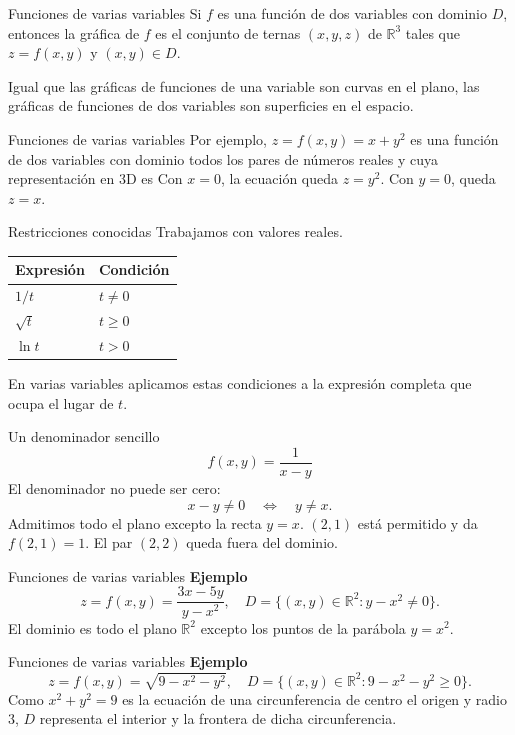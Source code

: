 \begin{frame}{Funciones de varias variables}
\small Si $f$ es una función de dos variables con dominio $D$, entonces la gráfica de $f$ es el conjunto de ternas $(x,y,z)$ de $\mathbb{R}^3$ tales que $z=f(x,y)$ y $(x,y)\in D$.
\medskip

Igual que las gráficas de funciones de una variable son curvas en el plano, las gráficas de funciones de dos variables son superficies en el espacio.
\end{frame}
\begin{frame}{Funciones de varias variables}
Por ejemplo, $z=f(x,y)=x+y^2$ es una función de dos variables con dominio todos los pares de números reales y cuya representación en 3D es
Con $x=0$, la ecuación queda $z=y^2$. Con $y=0$, queda $z=x$.
\end{frame}
\begin{frame}{Restricciones conocidas}
Trabajamos con valores reales.
\begin{center}\begin{tabular}{ll}
Expresión & Condición\\\hline
$1/t$ & $t\ne0$\\[3mm]
$\sqrt t$ & $t\ge0$\\[3mm]
$\ln t$ & $t>0$
\end{tabular}\end{center}
En varias variables aplicamos estas condiciones a la expresión completa que ocupa el lugar de $t$.
\end{frame}
\begin{frame}{Un denominador sencillo}
\[f(x,y)=\frac1{x-y}\]
El denominador no puede ser cero:
\[x-y\ne0\quad\Longleftrightarrow\quad y\ne x.\]
Admitimos todo el plano excepto la recta $y=x$.
\medskip
$(2,1)$ está permitido y da $f(2,1)=1$. El par $(2,2)$ queda fuera del dominio.
\end{frame}
\begin{frame}{Funciones de varias variables}
\textbf{Ejemplo}
\[z=f(x,y)=\frac{3x-5y}{y-x^2},\quad D=\{(x,y)\in\mathbb{R}^2:y-x^2\ne0\}.\]
El dominio es todo el plano $\mathbb{R}^2$ excepto los puntos de la parábola $y=x^2$.
\end{frame}
\begin{frame}{Funciones de varias variables}
\textbf{Ejemplo}
\[z=f(x,y)=\sqrt{9-x^2-y^2},\quad D=\{(x,y)\in\mathbb{R}^2:9-x^2-y^2\ge0\}.\]
\small Como $x^2+y^2=9$ es la ecuación de una circunferencia de centro el origen y radio $3$, $D$ representa el interior y la frontera de dicha circunferencia.
\end{frame}
